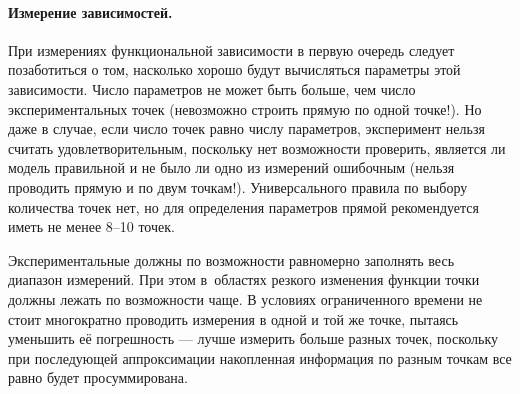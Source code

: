 


\paragraph{Измерение зависимостей.}
При измерениях функциональной зависимости в первую очередь следует позаботиться
о том, насколько хорошо будут вычисляться параметры этой зависимости.
Число параметров не может быть больше, чем число экспериментальных точек
(невозможно строить прямую по одной точке!). Но даже в случае, если число точек равно числу параметров, эксперимент нельзя считать удовлетворительным, поскольку нет возможности проверить, является ли модель правильной и не было ли одно из
измерений ошибочным (нельзя проводить прямую и по двум точкам!). Универсального правила по выбору количества точек нет, но для
определения параметров прямой рекомендуется иметь не менее 8--10 точек. 

Экспериментальные  должны по возможности равномерно заполнять весь диапазон измерений. При этом в~областях резкого изменения функции точки должны лежать по возможности чаще.
В условиях ограниченного времени не стоит многократно проводить измерения в одной и той же точке, пытаясь уменьшить её погрешность --- лучше измерить больше разных точек, поскольку при последующей аппроксимации накопленная информация по разным точкам все равно будет просуммирована.


